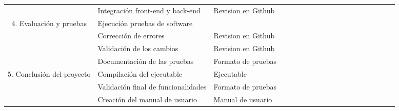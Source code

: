 \begin{table}[H]
\begin{adjustbox}{width={\textwidth},totalheight={\textheight},keepaspectratio}
\begin{tabular}{cp{10.555em}p{6.555em}rrrrrrrrrrrrrrrr}
    \cline{2-3}  & Integración front-end y back-end & Revision en Github &   &   &   & \cellcolor[rgb]{ .663,  .816,  .557}\textcolor[rgb]{ .886,  .937,  .855}{} & \cellcolor[rgb]{ .663,  .816,  .557}\textcolor[rgb]{ .886,  .937,  .855}{} & \cellcolor[rgb]{ .663,  .816,  .557}\textcolor[rgb]{ .886,  .937,  .855}{} & \cellcolor[rgb]{ .663,  .816,  .557}\textcolor[rgb]{ .886,  .937,  .855}{} & \cellcolor[rgb]{ .663,  .816,  .557}\textcolor[rgb]{ .886,  .937,  .855}{} &   &   &   &   &   &   &   &  \bigstrut\\
    \cline{1-3}\multicolumn{1}{c}{\multirow{4}[8]{*}{4. Evaluación y pruebas}} & Ejecución pruebas de software & \multicolumn{1}{r}{} &   &   &   &   &   &   & \cellcolor[rgb]{ .878,  .639,  .953} & \cellcolor[rgb]{ .878,  .639,  .953} & \cellcolor[rgb]{ .878,  .639,  .953} & \cellcolor[rgb]{ .878,  .639,  .953} &   &   &   &   &   &  \bigstrut\\
    \cline{2-3}  & Corrección de errores & Revision en Github &   &   &   &   &   &   & \cellcolor[rgb]{ .941,  .804,  .984} & \cellcolor[rgb]{ .941,  .804,  .984} & \cellcolor[rgb]{ .941,  .804,  .984} & \cellcolor[rgb]{ .941,  .804,  .984} & \cellcolor[rgb]{ .941,  .804,  .984} & \cellcolor[rgb]{ .941,  .804,  .984} &   &   &   &  \bigstrut\\
    \cline{2-3}  & Validación de los cambios & Revision en Github &   &   &   &   &   &   &   & \cellcolor[rgb]{ .878,  .639,  .953} & \cellcolor[rgb]{ .878,  .639,  .953} & \cellcolor[rgb]{ .878,  .639,  .953} & \cellcolor[rgb]{ .878,  .639,  .953} & \cellcolor[rgb]{ .878,  .639,  .953} &   &   &   &  \bigstrut\\
    \cline{2-3}  & Documentación de las pruebas & Formato de pruebas &   &   &   &   &   &   &   &   &   & \cellcolor[rgb]{ .941,  .804,  .984} & \cellcolor[rgb]{ .941,  .804,  .984} & \cellcolor[rgb]{ .941,  .804,  .984} &   &   &   &  \bigstrut\\
    \cline{1-3}\multicolumn{1}{c}{\multirow{4}[8]{*}{5. Conclusión del proyecto}} & Compilación del ejecutable & Ejecutable &   &   &   &   &   &   &   &   &   &   &   &   & \cellcolor[rgb]{ .957,  .69,  .518} & \cellcolor[rgb]{ .957,  .69,  .518} &   &  \bigstrut\\
    \cline{2-3}  & Validación final de funcionalidades & Formato de pruebas &   &   &   &   &   &   &   &   &   &   &   &   & \cellcolor[rgb]{ .988,  .894,  .839} & \cellcolor[rgb]{ .988,  .894,  .839} &   &  \bigstrut\\
    \cline{2-3}  & Creación del manual de usuario & Manual de usuario &   &   &   &   &   &   &   &   &   &   &   &   &   & \cellcolor[rgb]{ .957,  .69,  .518} & \cellcolor[rgb]{ .957,  .69,  .518} &  \bigstrut\\

\end{tabular}
\end{adjustbox}
\end{table}
